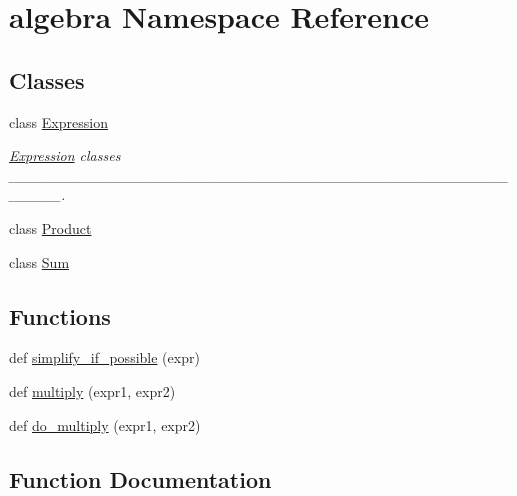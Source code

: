 \hypertarget{namespacealgebra}{}\section{algebra Namespace Reference}
\label{namespacealgebra}
\subsection*{Classes}
\begin{DoxyCompactItemize}
\item 
class \hyperlink{classalgebra_1_1_expression}{Expression}
\begin{DoxyCompactList}\small\item\em \hyperlink{classalgebra_1_1_expression}{Expression} classes \+\_\+\+\_\+\+\_\+\+\_\+\+\_\+\+\_\+\+\_\+\+\_\+\+\_\+\+\_\+\+\_\+\+\_\+\+\_\+\+\_\+\+\_\+\+\_\+\+\_\+\+\_\+\+\_\+\+\_\+\+\_\+\+\_\+\+\_\+\+\_\+\+\_\+\+\_\+\+\_\+\+\_\+\+\_\+\+\_\+\+\_\+\+\_\+\+\_\+\+\_\+\+\_\+\+\_\+\+\_\+\+\_\+\+\_\+\+\_\+\+\_\+\+\_\+\+\_\+\+\_\+\+\_\+\+\_\+\+\_\+\+\_\+\+\_\+\+\_\+\+\_\+\+\_\+\+\_\+. \end{DoxyCompactList}\item 
class \hyperlink{classalgebra_1_1_product}{Product}
\item 
class \hyperlink{classalgebra_1_1_sum}{Sum}
\end{DoxyCompactItemize}
\subsection*{Functions}
\begin{DoxyCompactItemize}
\item 
def \hyperlink{namespacealgebra_a3d670661d8c8c55f6bbdd902678f08a8}{simplify\+\_\+if\+\_\+possible} (expr)
\item 
def \hyperlink{namespacealgebra_a1293927dfb502302e1bfafa581d2d602}{multiply} (expr1, expr2)
\item 
def \hyperlink{namespacealgebra_a5ea0efba014ee3b9e07e77132793757c}{do\+\_\+multiply} (expr1, expr2)
\end{DoxyCompactItemize}


\subsection{Function Documentation}
\hypertarget{namespacealgebra_a5ea0efba014ee3b9e07e77132793757c}{}
